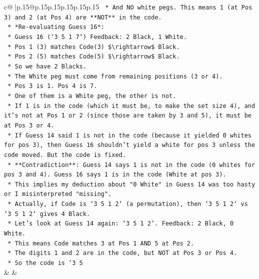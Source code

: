 \documentclass{article}
\begin{document}
{\begin{supertabular}{c@{$\;$}|p{.15\linewidth}@{}p{.15\linewidth}p{.15\linewidth}p{.15\linewidth}p{.15\linewidth}p{.15\linewidth}}
{{{\texttt{        *   And NO white pegs. This means 1 (at Pos 3) and 2 (at Pos 4) are **NOT** in the code.} \\
\texttt{    *   *Re{-}evaluating Guess 16*:} \\
\texttt{        *   Guess 16 (`3 5 1 7`) Feedback: 2 Black, 1 White.} \\
\texttt{        *   Pos 1 (3) matches Code(3) \$\textbackslash{}rightarrow\$ Black.} \\
\texttt{        *   Pos 2 (5) matches Code(5) \$\textbackslash{}rightarrow\$ Black.} \\
\texttt{        *   So we have 2 Blacks.} \\
\texttt{        *   The White peg must come from remaining positions (3 or 4).} \\
\texttt{        *   Pos 3 is 1. Pos 4 is 7.} \\
\texttt{        *   One of them is a White peg, the other is not.} \\
\texttt{        *   If 1 is in the code (which it must be, to make the set size 4), and it's not at Pos 1 or 2 (since those are taken by 3 and 5), it must be at Pos 3 or 4.} \\
\texttt{        *   If Guess 14 said 1 is not in the code (because it yielded 0 whites for pos 3), then Guess 16 shouldn't yield a white for pos 3 unless the code moved. But the code is fixed.} \\
\texttt{        *   **Contradiction**: Guess 14 says 1 is not in the code (0 whites for pos 3 and 4). Guess 16 says 1 is in the code (White at pos 3).} \\
\texttt{        *   This implies my deduction about "0 White" in Guess 14 was too hasty or I misinterpreted "missing".} \\
\texttt{        *   Actually, if Code is `3 5 1 2` (a permutation), then `3 5 1 2` vs `3 5 1 2` gives 4 Black.} \\
\texttt{        *   Let's look at Guess 14 again: `3 5 1 2`. Feedback: 2 Black, 0 White.} \\
\texttt{        *   This means Code matches 3 at Pos 1 AND 5 at Pos 2.} \\
\texttt{        *   The digits 1 and 2 are in the code, but NOT at Pos 3 or Pos 4.} \\
\texttt{        *   So the code is `3 5} \\
            }
        }
    }
    & & \\ \\


\end{supertabular}}
\end{document}
